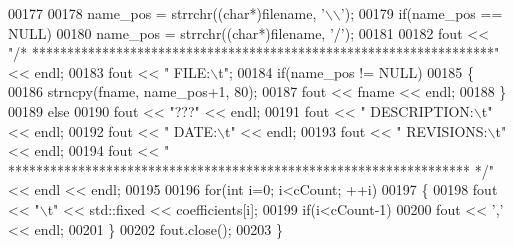 \begin{DoxyCode}
00177 
00178     name\_pos = strrchr((\textcolor{keywordtype}{char}*)filename, \textcolor{charliteral}{'\(\backslash\)\(\backslash\)'});
00179     \textcolor{keywordflow}{if}(name\_pos == NULL)
00180         name\_pos = strrchr((\textcolor{keywordtype}{char}*)filename, \textcolor{charliteral}{'/'});
00181 
00182     fout << \textcolor{stringliteral}{"/* ******************************************************************"} << endl;
00183     fout << \textcolor{stringliteral}{"   FILE:\(\backslash\)t"};
00184     \textcolor{keywordflow}{if}(name\_pos != NULL)
00185     \{
00186         strncpy(fname, name\_pos+1, 80);
00187         fout << fname << endl;
00188     \}
00189     \textcolor{keywordflow}{else}
00190         fout << \textcolor{stringliteral}{"???"} << endl;
00191     fout << \textcolor{stringliteral}{"   DESCRIPTION:\(\backslash\)t"} << endl;
00192     fout << \textcolor{stringliteral}{"   DATE:\(\backslash\)t"} << endl;
00193     fout << \textcolor{stringliteral}{"   REVISIONS:\(\backslash\)t"} << endl;
00194     fout << \textcolor{stringliteral}{"   ****************************************************************** */"} << endl << endl;
00195 
00196     \textcolor{keywordflow}{for}(\textcolor{keywordtype}{int} i=0; i<cCount; ++i)
00197     \{
00198         fout << \textcolor{stringliteral}{"\(\backslash\)t"} << std::fixed << coefficients[i];
00199         \textcolor{keywordflow}{if}(i<cCount-1)
00200             fout << \textcolor{charliteral}{','} << endl;
00201     \}
00202     fout.close();
00203 \}
\end{DoxyCode}
